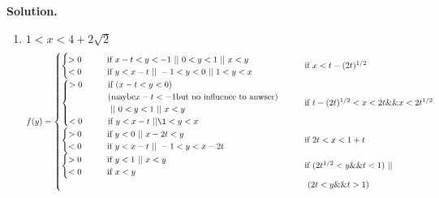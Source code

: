 \documentclass[a4paper]{book}
\newenvironment{solution}%
{\noindent\textbf{Solution.}}%
{\qedhere}
\numberwithin{equation}{chapter}
\theoremstyle{definition}
\begin{document}
\begin{solution}
\begin{enumerate}
  \item $1 < x < 4 + 2\sqrt{2}$
    \[f(y) =
      \begin{aligned}
        \begin{cases}
          \begin{cases}
            > 0 \qquad &\textmd{if } x - t < y < -1\ ||\ 0 < y < 1\ || \ x < y \\
            < 0  \qquad &\textmd{if } y < x - t\ ||\ -1 < y < 0 \ || \ 1 < y < x \\
          \end{cases}  \qquad &\textmd{if } x < t - (2t)^{1/2} \\
          \begin{cases}
            > 0 \qquad &\textmd{if } (x - t < y < 0) \\&(\textmd{maybe} x-t < -1\textmd{but no influence to anwser})\\ &\ ||\ 0 < y < 1 \ ||\ x < y  \\
            < 0  \qquad &\textmd{if } y < x - t \ || \1 < y < x \\
          \end{cases}  \qquad &\textmd{if } t - (2t)^{1/2} < x < 2t \&\& x < 2t^{1/2}   \\
          \begin{cases}
            > 0 \qquad &\textmd{if } y < 0\ ||\ x - 2t < y \\
            < 0  \qquad &\textmd{if } y < x - t\ ||\ -1 < y < x - 2t \\
          \end{cases}  \qquad &\textmd{if } 2t < x < 1 + t \\
          \begin{cases}
            > 0 \qquad &\textmd{if } y < 1 \ || \ x < y \\
            < 0  \qquad &\textmd{if } x < y  \\
          \end{cases}  \qquad &\textmd{if } (2t^{1/2} < y \&\& t < 1) \ ||\\& \ ( 2t < y \&\& t > 1)
        \end{cases}
      \end{aligned}
\]
\end{enumerate}
\end{solution}
\end{document}
